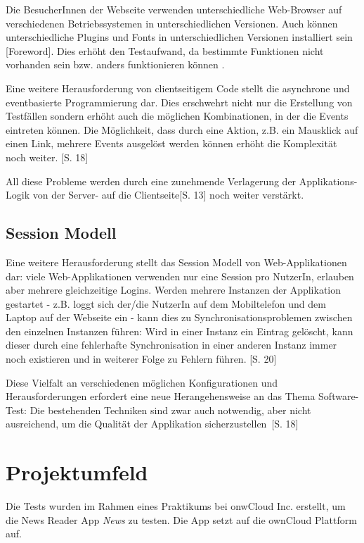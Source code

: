 \documentclass[a4paper,bibtotoc,oneside]{scrbook}
\begin{document}
Die BesucherInnen der Webseite verwenden unterschiedliche Web-Browser auf verschiedenen Betriebssystemen in unterschiedlichen Versionen. Auch können unterschiedliche Plugins und Fonts in unterschiedlichen Versionen installiert sein \cite{testing_apps_on_web}[Foreword]. Dies erhöht den Testaufwand, da bestimmte Funktionen nicht vorhanden sein bzw. anders funktionieren können \cite{caniuse}.

Eine weitere Herausforderung von clientseitigem Code stellt die asynchrone und eventbasierte Programmierung dar. Dies erschwehrt nicht nur die Erstellung von Testfällen sondern erhöht auch die möglichen Kombinationen, in der die Events eintreten können. Die Möglichkeit, dass durch eine Aktion, z.B. ein Mausklick auf einen Link, mehrere Events ausgelöst werden können erhöht die Komplexität noch weiter. \cite{testing_apps_on_web}[S. 18]

All diese Probleme werden durch eine zunehmende Verlagerung der Applikations-Logik von der Server- auf die Clientseite\cite{testing_apps_on_web}[S. 13] noch weiter verstärkt.

\section{Session Modell}
Eine weitere Herausforderung stellt das Session Modell von Web-Applikationen dar: viele Web-Applikationen verwenden nur eine Session pro NutzerIn, erlauben aber mehrere gleichzeitige Logins. Werden mehrere Instanzen der Applikation gestartet - z.B. loggt sich der/die NutzerIn auf dem Mobiltelefon und dem Laptop auf der Webseite ein - kann dies zu Synchronisationsproblemen zwischen den einzelnen Instanzen führen: Wird in einer Instanz ein Eintrag gelöscht, kann dieser durch eine fehlerhafte Synchronisation in einer anderen Instanz immer noch existieren und in weiterer Folge zu Fehlern führen. \cite{testing_apps_on_web}[S. 20]


Diese Vielfalt an verschiedenen möglichen Konfigurationen und Herausforderungen erfordert eine neue Herangehensweise an das Thema Software-Test: Die bestehenden Techniken sind \glqq zwar auch notwendig, aber nicht ausreichend, um die Qualität der Applikation sicherzustellen\grqq\ \cite{eval_automat_webapp_test}[S. 18]


\chapter{Projektumfeld}
Die Tests wurden im Rahmen eines Praktikums bei onwCloud Inc. erstellt, um die News Reader App \emph{News} zu testen. Die App setzt auf die ownCloud\cite{owncloud} Plattform auf.
\end{document}
